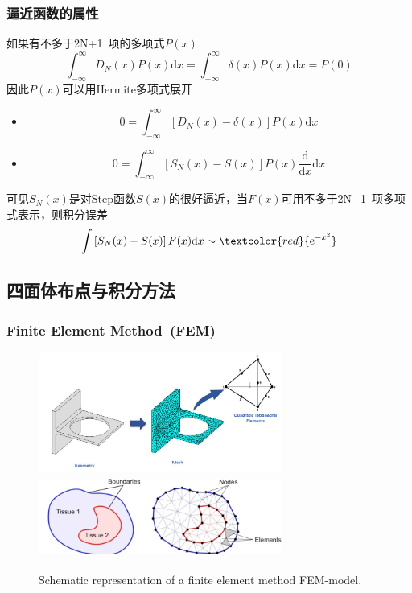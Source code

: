 \frame
{
	\frametitle{逼近函数的属性}
	如果有不多于\textrm{2N+1~}项的多项式$P(x)$
	\begin{displaymath}
		\int_{-\infty}^{\infty}D_N(x)P(x)\mathrm{d}x=\int_{-\infty}^{\infty}\delta(x)P(x)\mathrm{d}x=P(0)
	\end{displaymath}
	因此$P(x)$可以用\textrm{Hermite}多项式展开
\begin{itemize}
	\item \begin{displaymath}
			0=\int_{-\infty}^{\infty}\left[D_N(x)-\delta(x)\right]P(x)\mathrm{d}x
	\end{displaymath}
	\item \begin{displaymath}
			0=\int_{-\infty}^{\infty}\left[S_N(x)-S(x)\right]P(x)\frac{{\mathrm d}}{\mathrm dx}\mathrm{d}x
	\end{displaymath}
\end{itemize}
可见$S_N(x)$是对\textrm{Step}函数$S(x)$的很好逼近，当$F(x)$可用不多于\textrm{2N+1~}项多项式表示，则积分误差
$$\int\left[S_N(x)-S(x)\right]F(x)\mathrm{d}x\sim\textcolor{red}{\mathrm{e}^{-x^2}}$$
}

\subsection{四面体布点与积分方法}
\frame
{
	\frametitle{\rm{Finite Element Method~(FEM)}}
\begin{figure}[h!]
\centering
\vspace*{-0.25in}
	\includegraphics[height=1.55in,width=3.15in,viewport=30 0 900 500,clip]{Figures/Finite_element_analysis.jpg}
	\vskip 2pt
	\includegraphics[height=1.05in,width=3.15in,viewport=0 0 850 285,clip]{Figures/Schematic-representation-of-a-finite_element_method-FEM-model.png}
	\caption{\tiny \textrm{Schematic representation of a finite element method FEM-model.}}%
\label{Fig:FEM}
\end{figure}
}


